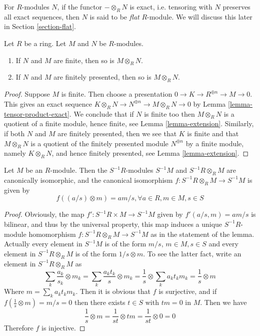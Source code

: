 \begin{remark}
\label{remark-flat-module}
For $R$-modules $N$, if the
functor $-\otimes_R N$ is exact, i.e. tensoring
with $N$ preserves all exact
sequences, then $N$ is said to be {\it flat} $R$-module.
We will discuss this later in Section \ref{section-flat}.
\end{remark}

\begin{lemma}
\label{lemma-tensor-finiteness}
Let $R$ be a ring. Let $M$ and $N$ be $R$-modules.
\begin{enumerate}
\item If $N$ and $M$ are finite, then so is $M \otimes_R N$.
\item If $N$ and $M$ are finitely presented, then so is $M \otimes_R N$.
\end{enumerate}
\end{lemma}

\begin{proof}
Suppose $M$ is finite. Then choose a presentation
$0 \to K \to R^{\oplus n} \to M \to 0$. This gives an exact sequence
$K \otimes_R N \to N^{\oplus n} \to M \otimes_R N \to 0$ by
Lemma \ref{lemma-tensor-product-exact}.
We conclude that if $N$ is finite too then $M \otimes_R N$
is a quotient of a finite module, hence finite, see
Lemma \ref{lemma-extension}.
Similarly, if both $N$ and $M$ are finitely presented, then
we see that $K$ is finite and that $M \otimes_R N$
is a quotient of the finitely presented module $N^{\oplus n}$ by
a finite module, namely $K \otimes_R N$, and hence finitely presented, see
Lemma \ref{lemma-extension}.
\end{proof}

\begin{lemma}
\label{lemma-tensor-localization}
Let $M$ be an $R$-module. Then the $S^{-1}R$-modules $S^{-1}M$
and $S^{-1}R \otimes_R M$ are canonically isomorphic, and the
canonical isomorphism $f : S^{-1}R \otimes_R M \to S^{-1}M$
is given by
$$
f((a/s) \otimes m) = am/s, \forall a \in R, m \in M, s \in S
$$
\end{lemma}

\begin{proof}
Obviously, the map
$f' : S^{-1}R \times M \to S^{-1}M$ given by $f'(a/s, m) = am/s$ is
bilinear, and thus by the
universal property, this map induces a unique $S^{-1}R$-module homomorphism
$f : S^{-1}R \otimes_R M \to S^{-1}M$ as in the statement of the lemma.
Actually every element in $S^{-1}M$ is of the form $m/s$, $m\in M, s\in S$ and
every element in
$S^{-1}R \otimes_R M$ is of the form $1/s \otimes m$. To see the latter fact,
write an element in
$S^{-1}R \otimes_R M$ as
$$
\sum_k \frac{a_k}{s_k} \otimes m_k =
\sum_k \frac{a_k t_k}{s} \otimes m_k =
\frac{1}{s} \otimes \sum_k {a_k t_k}m_k = \frac{1}{s} \otimes m
$$
Where $m = \sum_k {a_k t_k}m_k$. Then it is obvious that $f$ is surjective,
and if $f(\frac{1}{s} \otimes m) = m/s = 0$ then there exists $t \in S$ with
$tm = 0$ in $M$. Then we have
$$
\frac{1}{s} \otimes m = \frac{1}{st} \otimes tm = \frac{1}{st} \otimes 0 = 0
$$
Therefore $f$ is injective.
\end{proof}

